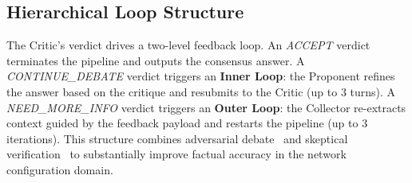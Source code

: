 
\subsection{Hierarchical Loop Structure}

The Critic's verdict drives a two-level feedback loop.
An \textit{ACCEPT} verdict terminates the pipeline and outputs the consensus answer.
A \textit{CONTINUE\_DEBATE} verdict triggers an \textbf{Inner Loop}: the Proponent refines the answer based on the critique and resubmits to the Critic (up to 3 turns).
A \textit{NEED\_MORE\_INFO} verdict triggers an \textbf{Outer Loop}: the Collector re-extracts context guided by the feedback payload and restarts the pipeline (up to 3 iterations).
This structure combines adversarial debate~\cite{du2024improving} and skeptical verification~\cite{liang2024encouraging} to substantially improve factual accuracy in the network configuration domain.





